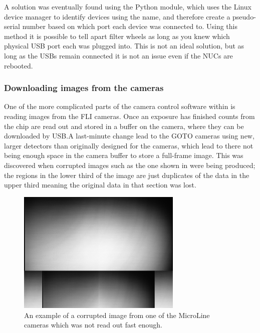 \begin{colsection}
\begin{colsection}
A solution was eventually found using the Python  module, which uses the Linux  device manager to identify devices using the  name, and therefore create a pseudo-serial number based on which port each device was connected to. Using this method it is possible to tell apart filter wheels as long as you knew which physical USB port each was plugged into. This is not an ideal solution, but as long as the USBs remain connected it is not an issue even if the NUCs are rebooted.

\subsubsection{Downloading images from the cameras}

One of the more complicated parts of the camera control software within  is reading images from the FLI cameras. Once an exposure has finished counts from the chip are read out and stored in a buffer on the camera, where they can be downloaded by USB.\@ A last-minute change lead to the GOTO cameras using new, larger detectors than originally designed for the cameras, which lead to there not being enough space in the camera buffer to store a full-frame image. This was discovered when corrupted images such as the one shown in  were being produced; the regions in the lower third of the image are just duplicates of the data in the upper third meaning the original data in that section was lost.

\begin{figure}[t]
    \begin{center}
        \includegraphics[width=0.7\textwidth]{images/cam_readout.png}
    \end{center}
    \caption[A corrupted image which was not read out fast enough]{
        An example of a corrupted image from one of the MicroLine cameras which was not read out fast enough.
    }\label{fig:cam_readout}
\end{figure}


\end{colsection}
\end{colsection}
